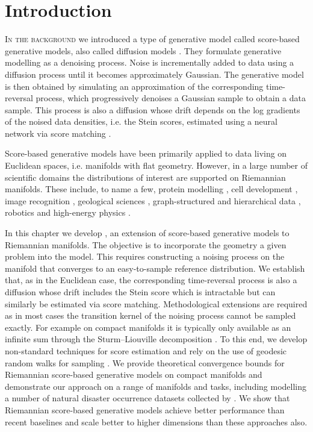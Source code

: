 
\section{Introduction}
\label{sec:introduction-rsgm}
\lettrine{I}{n the background} we introduced a type of generative model called score-based generative models, also called diffusion models \parencite{song2019generative,song2020score,ho2020denoising,nichol2021beatgans}.
They formulate generative modelling as a denoising process.
Noise is incrementally added to data using a diffusion process until it becomes approximately Gaussian.
The generative model is then obtained by simulating an approximation of the corresponding time-reversal process, which progressively denoises a Gaussian sample to obtain a data sample.
This process is also a diffusion whose drift depends on the log gradients of the noised data densities, i.e. the Stein scores, estimated using a neural network via score matching \parencite{hyvarinen05a,vincent2011connection}.

Score-based generative models have been primarily applied to data living on Euclidean spaces, i.e. manifolds with flat geometry.
However, in a large number of scientific domains the distributions of interest are supported on Riemannian manifolds.
These include, to name a few, protein modelling \parencite{shapovalov2011smoothed}, cell development \parencite{klimovskaia2020poincare}, image recognition \parencite{lui2012advances}, geological sciences \parencite{karpatne2018machine,peel2001fitting}, graph-structured and hierarchical data \parencite{roy2007learning,steyvers2005large}, robotics \parencite{feiten2013rigid,senanayake2018directional} and high-energy physics \parencite{brehmer2020flows}.

In this chapter we develop , an extension of score-based generative models to Riemannian manifolds.
The objective is to incorporate the geometry a given problem into the model.
This requires constructing a noising process on the manifold that converges to an easy-to-sample reference distribution.
We establish that, as in the Euclidean case, the corresponding time-reversal process is also a diffusion whose drift includes the Stein score which is intractable but can similarly be estimated via score matching.
Methodological extensions are required as in most cases the transition kernel of the noising process cannot be sampled exactly.
For example on compact manifolds it is typically only available as an infinite sum through the Sturm--Liouville decomposition \parencite{chavel1984eigenvalues}.
To this end, we develop non-standard techniques for score estimation and rely on the use of geodesic random walks for sampling \parencite{jorgensen1975central}.
We provide theoretical convergence bounds for Riemannian score-based generative models on compact manifolds and demonstrate our approach on a range of manifolds and tasks, including modelling a number of natural disaster occurrence datasets collected by \textcite{mathieu2020riemannian}.
We show that Riemannian score-based generative models achieve better performance than recent baselines \parencite{mathieu2020riemannian,rozen2021moser} and scale better to higher dimensions than these approaches also.

